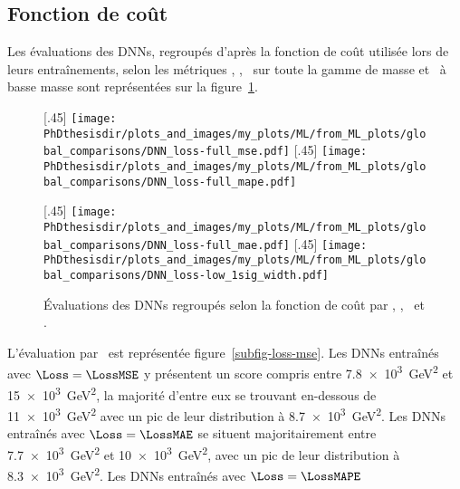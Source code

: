 \subsection{Fonction de coût}\label{chapter-ML-section-hyperparameters-loss}
Les évaluations des DNNs,
regroupés d'après la fonction de coût utilisée lors de leurs entraînements,
selon les métriques
\LossMSE, \LossMAPE, \LossMAE\ sur toute la gamme de masse et \OneSigmaWidth\ à basse masse
sont représentées sur la figure~\ref{fig-DNN_losses}.
\begin{figure}[h]
\centering

\subcaptionbox{\label{subfig-loss-mse}}[.45\textwidth]
{\texttt{[image: \\PhDthesisdir/plots\_and\_images/my\_plots/ML/from\_ML\_plots/global\_comparisons/DNN\_loss-full\_mse.pdf]}\vspace{-\baselineskip}}
\hfill
\subcaptionbox{\label{subfig-loss-mape}}[.45\textwidth]
{\texttt{[image: \\PhDthesisdir/plots\_and\_images/my\_plots/ML/from\_ML\_plots/global\_comparisons/DNN\_loss-full\_mape.pdf]}\vspace{-\baselineskip}}

\vspace{\baselineskip}

\subcaptionbox{\label{subfig-loss-mae}}[.45\textwidth]
{\texttt{[image: \\PhDthesisdir/plots\_and\_images/my\_plots/ML/from\_ML\_plots/global\_comparisons/DNN\_loss-full\_mae.pdf]}\vspace{-\baselineskip}}
\hfill
\subcaptionbox{\label{subfig-loss-low_1sigma}}[.45\textwidth]
{\texttt{[image: \\PhDthesisdir/plots\_and\_images/my\_plots/ML/from\_ML\_plots/global\_comparisons/DNN\_loss-low\_1sig\_width.pdf]}\vspace{-\baselineskip}}

\caption{Évaluations des DNNs regroupés selon la fonction de coût par \LossMSE, \LossMAPE, \LossMAE\ et \OneSigmaWidth.}
\label{fig-DNN_losses}
\end{figure}
\par
L'évaluation par \LossMSE\ est représentée figure~\ref{subfig-loss-mse}.
Les DNNs entraînés avec $\Loss=\LossMSE$
y présentent un score
compris entre \SI{7.8e3}{\GeV^2} et \SI{15e3}{\GeV^2},
la majorité d'entre eux se trouvant en-dessous de \SI{11e3}{\GeV^2}
avec un pic de leur distribution à \SI{8.7e3}{\GeV^2}.
Les DNNs entraînés avec $\Loss=\LossMAE$
se situent majoritairement
entre \SI{7.7e3}{\GeV^2} et \SI{10e3}{\GeV^2},
avec un pic de leur distribution à \SI{8.3e3}{\GeV^2}.
Les DNNs entraînés avec $\Loss=\LossMAPE$
